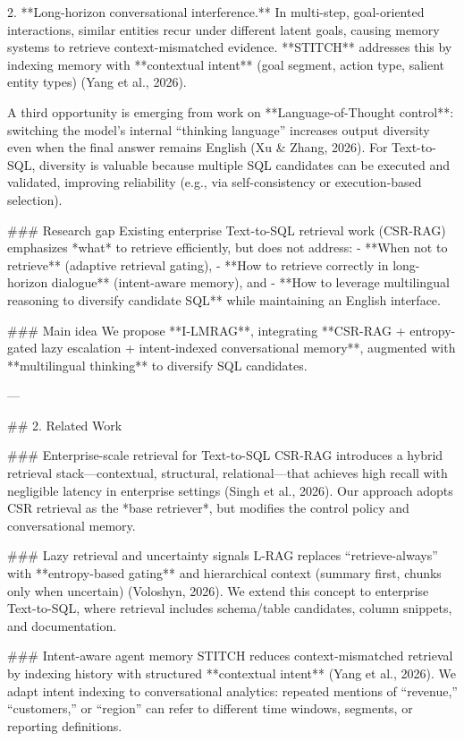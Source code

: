 2. **Long-horizon conversational interference.** In multi-step, goal-oriented interactions, similar entities recur under different latent goals, causing memory systems to retrieve context-mismatched evidence. **STITCH** addresses this by indexing memory with **contextual intent** (goal segment, action type, salient entity types) (Yang et al., 2026).

A third opportunity is emerging from work on **Language-of-Thought control**: switching the model’s internal “thinking language” increases output diversity even when the final answer remains English (Xu & Zhang, 2026). For Text-to-SQL, diversity is valuable because multiple SQL candidates can be executed and validated, improving reliability (e.g., via self-consistency or execution-based selection).

### Research gap  
Existing enterprise Text-to-SQL retrieval work (CSR-RAG) emphasizes *what* to retrieve efficiently, but does not address:  
- **When not to retrieve** (adaptive retrieval gating),  
- **How to retrieve correctly in long-horizon dialogue** (intent-aware memory), and  
- **How to leverage multilingual reasoning to diversify candidate SQL** while maintaining an English interface.

### Main idea  
We propose **I-LMRAG**, integrating **CSR-RAG + entropy-gated lazy escalation + intent-indexed conversational memory**, augmented with **multilingual thinking** to diversify SQL candidates.

---

## 2. Related Work  

### Enterprise-scale retrieval for Text-to-SQL  
CSR-RAG introduces a hybrid retrieval stack—contextual, structural, relational—that achieves high recall with negligible latency in enterprise settings (Singh et al., 2026). Our approach adopts CSR retrieval as the *base retriever*, but modifies the control policy and conversational memory.

### Lazy retrieval and uncertainty signals  
L-RAG replaces “retrieve-always” with **entropy-based gating** and hierarchical context (summary first, chunks only when uncertain) (Voloshyn, 2026). We extend this concept to enterprise Text-to-SQL, where retrieval includes schema/table candidates, column snippets, and documentation.

### Intent-aware agent memory  
STITCH reduces context-mismatched retrieval by indexing history with structured **contextual intent** (Yang et al., 2026). We adapt intent indexing to conversational analytics: repeated mentions of “revenue,” “customers,” or “region” can refer to different time windows, segments, or reporting definitions.

